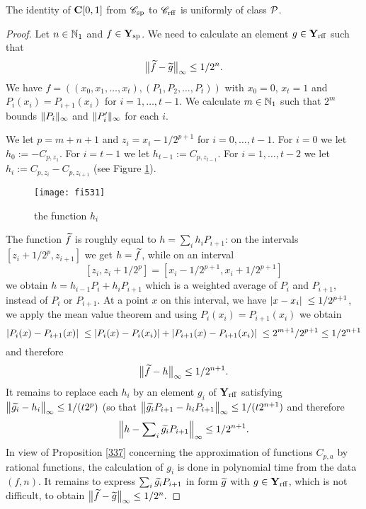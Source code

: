 \begin{theorem} \label{531}
The identity of ${{\bf C}[0,1]}$ from ${{{\mathscr C}}_{\rm sp}}$ to ${{{\mathscr C}}_{\rm rff}}$ is uniformly of class ${\cal P}$.
\end{theorem}

\begin{proof} 
Let $n \in \mathbb {N}_1$ and $f \in {{\bf Y}_{\rm sp}}$. We need to calculate an element $g \in {{\bf Y}_{\rm rff}} $ such that 
\[
\big\lVert  \widetilde{f} - \widetilde{g}  \big\rVert_{\infty} \leq 1/2^n.
\] 
We have $f = ((x_0,x_1,\ldots,x_t),(P_1,P_2,\ldots,P_t))$ with $x_0=0$, $x_t=1$ and $P_i(x_i) = P_{i+1}(x_i)$ for $i = 1,\ldots,t-1$.
 We calculate $m \in \mathbb {N}_1$ such that $2^m$ bounds  
$\lVert P_i \rVert_{\infty}$ and  $\lVert P_i' \rVert_{\infty}$ for each $i$. 

\noindent 
We let $p=m+n+1$ and $z_i = x_i - 1/2^{p+1}$ for $i=0,\dots,t-1$. For $i = 0$  we let $h_0 := -C_{p,z_1}$. For $i = t-1$ we let $h_{t-1}:=C_{p,z_{t-1}}$. 
For $i = 1,\ldots,t-2$ we let $h_i := C_{p,z_i} - C_{p,z_{i+1}}$  (see Figure \ref{fi531}). 

\noindent 
\begin{figure}[htbp] 
\begin{center}
\texttt{[image: fi531]}
\end{center}
\caption[The $h_i$ function]{\label{fi531} 
the function $h_i$} 
\end{figure} 

\noindent 
The function $\widetilde{f}$ is roughly equal to 
$h = \sum_i h_iP_{i+1}$: on the intervals $[z_i+1/2^p, z_{i+1} ]$ 
we get $h =\widetilde{f}$, while on an interval 
\[
[z_i, z_i +1/2^p] = [x_i - 1/2^{p+1}, x_i +1/2^{p+1}]
\]
we obtain $h = h_{i-1}P_i + h_i P_{i+1}$ which is a weighted average of $P_i$ and $P_{i+1}$, instead of $P_i$ or $P_{i+1}$. 
At a point $x$ on this interval, we have $\left|{x-x_i}\right|\; \leq 1/2^{p+1}$, 
we apply the mean value theorem and using $P_i(x_i) =P_{i+1}(x_i)$ we obtain
\[
\left|{P_i(x) - P_{i+1}(x)}\right|\; \leq \left|{P_i(x) - P_i(x_i)}\right| + \left|{P_{i+1}(x) - P_{i+1}(x_i)}\right|\; \leq 2^{m+1}/2^{p+1} \leq 1/2^{n+1}
\]
and therefore
\[
\big\lVert  \widetilde{f} - h  \big\rVert_{\infty} \leq 1/2^{n+1}.
\]
It remains to replace each $h_i$ by an element $g_i$ of ${{\bf Y}_{\rm rff}}$ satisfying $\big\lVert  \widetilde{g_i} - h_i  \big\rVert_{\infty} \leq 1/(t2^{p})$
 (so that
$\big\lVert \widetilde{g_i}P_{i+1}-h_iP_{i+1} \big\rVert_{\infty}\leq 1/(t2^{n+1})$
and therefore
\[
\Big\lVert  h - \sum\nolimits_i \widetilde{g_i}P_{i+1}  \Big\rVert_\infty \leq 1/2^{n+1}.
\]
In view of Proposition \ref{337} concerning the approximation of functions $C_{p,a}$ by rational functions, the calculation of $g_i$ is done in polynomial time from the data $(f,n)$. It remains to express $\sum_i\widetilde{g_i}P_{i+1}$ in form $\widetilde{g}$ with $ g \in {{\bf Y}_{\rm rff}}$, which is not difficult, to obtain $\big\lVert  \widetilde{f} - \widetilde{g}  \big\rVert_{\infty} \leq 1/2^n.$ 
\end{proof}

